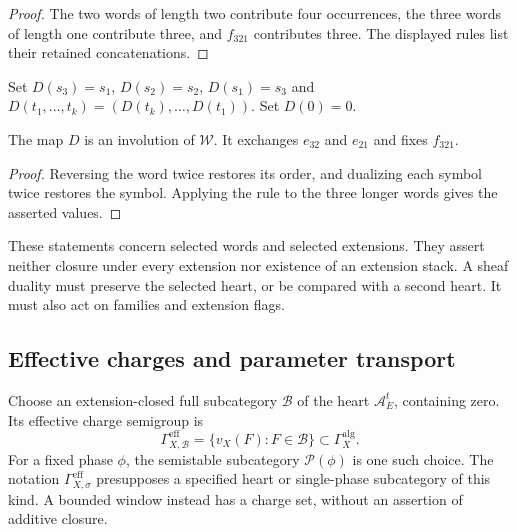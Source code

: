 \begin{proof}
The two words of length two contribute four occurrences, the three
words of length one contribute three, and $f_{321}$ contributes three.
The displayed rules list their retained concatenations.
\end{proof}

\begin{definition}
\label{def:retained-dual-closure-datum}
Set $D(s_3)=s_1$, $D(s_2)=s_2$, $D(s_1)=s_3$ and
$D(t_1,\ldots,t_k)=(D(t_k),\ldots,D(t_1))$.  Set $D(0)=0$.
\end{definition}

\begin{proposition}
\label{prop:retained-dual-closure}
The map $D$ is an involution of $\mathcal W$.  It exchanges
$e_{32}$ and $e_{21}$ and fixes $f_{321}$.
\end{proposition}

\begin{proof}
Reversing the word twice restores its order, and dualizing each
symbol twice restores the symbol.  Applying the rule to the three
longer words gives the asserted values.
\end{proof}

These statements concern selected words and selected extensions.
They assert neither closure under every extension nor existence of
an extension stack.  A sheaf duality must preserve the selected heart, or be compared
with a second heart.  It must also act on families and extension flags.

\subsection{Effective charges and parameter transport}

\begin{definition}
\label{def:algebraic-effective-hall-support}
Choose an extension-closed full subcategory $\mathcal B$ of the heart
$\mathcal A_E^t$, containing zero.  Its effective charge semigroup is
\[
\Gamma_{X,\mathcal B}^{\mathrm{eff}}
=\{v_X(F):F\in\mathcal B\}\subset\Gamma_X^{\mathrm{alg}}.
\]
For a fixed phase $\phi$, the semistable subcategory
$\mathcal P(\phi)$ is one such choice.  The notation
$\Gamma_{X,\sigma}^{\mathrm{eff}}$ presupposes a specified heart or
single-phase subcategory of this kind.  A bounded window instead
has a charge set, without an assertion of additive closure.
\end{definition}

